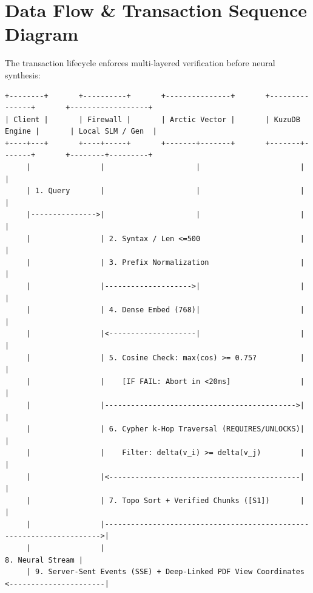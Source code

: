 \documentclass[10pt,a4paper]{article}
\begin{document}
\newpage

\section{Data Flow \& Transaction Sequence Diagram}
The transaction lifecycle enforces multi-layered verification before neural synthesis:

\begin{lstlisting}[basicstyle=\ttfamily\scriptsize]
+--------+       +----------+       +---------------+       +---------------+       +------------------+
| Client |       | Firewall |       | Arctic Vector |       | KuzuDB Engine |       | Local SLM / Gen  |
+----+---+       +----+-----+       +-------+-------+       +-------+-------+       +--------+---------+
     |                |                     |                       |                        |
     | 1. Query       |                     |                       |                        |
     |--------------->|                     |                       |                        |
     |                | 2. Syntax / Len <=500                       |                        |
     |                | 3. Prefix Normalization                     |                        |
     |                |-------------------->|                       |                        |
     |                | 4. Dense Embed (768)|                       |                        |
     |                |<--------------------|                       |                        |
     |                | 5. Cosine Check: max(cos) >= 0.75?          |                        |
     |                |    [IF FAIL: Abort in <20ms]                |                        |
     |                |-------------------------------------------->|                        |
     |                | 6. Cypher k-Hop Traversal (REQUIRES/UNLOCKS)|                        |
     |                |    Filter: delta(v_i) >= delta(v_j)         |                        |
     |                |<--------------------------------------------|                        |
     |                | 7. Topo Sort + Verified Chunks ([S1])       |                        |
     |                |--------------------------------------------------------------------->|
     |                |                                                     8. Neural Stream |
     | 9. Server-Sent Events (SSE) + Deep-Linked PDF View Coordinates <----------------------|
\end{lstlisting}
\end{document}
